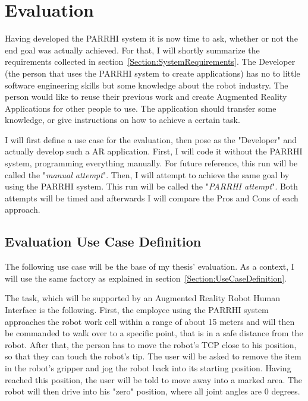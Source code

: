 \chapter{Evaluation}\label{Chap:Evaluation}

Having developed the PARRHI system it is now time to ask, whether or not the end goal was actually achieved. For that, I will shortly summarize the requirements collected in section~\ref{Section:SystemRequirements}. The Developer (the person that uses the PARRHI system to create applications) has no to little software engineering skills but some knowledge about the robot industry. The person would like to reuse their previous work and create Augmented Reality Applications for other people to use. The application should transfer some knowledge, or give instructions on how to achieve a certain task.

I will first define a use case for the evaluation, then pose as the "Developer" and actually develop such a AR application. First, I will code it without the PARRHI system, programming everything manually. For future reference, this run will be called the "\textit{manual attempt}". Then, I will attempt to achieve the same goal by using the PARRHI system. This run will be called the "\textit{PARRHI attempt}". Both attempts will be timed and afterwards I will compare the Pros and Cons of each approach.

\section{Evaluation Use Case Definition}
The following use case will be the base of my thesis' evaluation. As a context, I will use the same factory as explained in section~\ref{Section:UseCaseDefinition}. 

The task, which will be supported by an Augmented Reality Robot Human Interface is the following. First, the employee using the PARRHI system approaches the robot work cell within a range of about 15 meters and will then be commanded to walk over to a specific point, that is in a safe distance from the robot. After that, the person has to move the robot's TCP close to his position, so that they can touch the robot's tip. The user will be asked to remove the item in the robot's gripper and jog the robot back into its starting position. Having reached this position, the user will be told to move away into a marked area. The robot will then drive into his "zero" position, where all joint angles are 0 degrees. 

